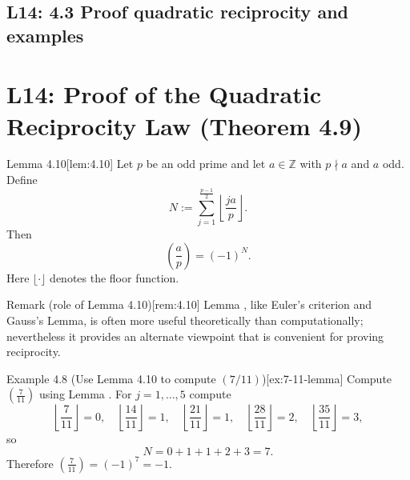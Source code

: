 \documentclass[10pt]{article}
\theoremstyle{definition}
\theoremstyle{plain}
\numberwithin{equation}{section}
\begin{document}
\newpage
\subsection{L14: 4.3 Proof quadratic reciprocity and examples}

\section*{L14: Proof of the Quadratic Reciprocity Law (Theorem 4.9)}

\begin{define}{Lemma 4.10}[lem:4.10]
Let $p$ be an odd prime and let $a\in\mathbb{Z}$ with $p\nmid a$ and $a$ odd. Define
\[
N:=\sum_{j=1}^{\frac{p-1}{2}}\left\lfloor\frac{j a}{p}\right\rfloor .
\]
Then
\[
\left(\frac{a}{p}\right)=(-1)^N.
\]
Here $\lfloor \cdot\rfloor$ denotes the floor function.
\end{define}

\begin{define}{Remark (role of Lemma 4.10)}[rem:4.10]
Lemma , like Euler's criterion and Gauss's Lemma, is often more useful theoretically than computationally; nevertheless it provides an alternate viewpoint that is convenient for proving reciprocity.
\end{define}

\begin{define}{Example 4.8 (Use Lemma 4.10 to compute $(7/11)$)}[ex:7-11-lemma]
Compute $(\tfrac{7}{11})$ using Lemma . For $j=1,\dots,5$ compute
\[
\left\lfloor\frac{7}{11}\right\rfloor=0,\quad
\left\lfloor\frac{14}{11}\right\rfloor=1,\quad
\left\lfloor\frac{21}{11}\right\rfloor=1,\quad
\left\lfloor\frac{28}{11}\right\rfloor=2,\quad
\left\lfloor\frac{35}{11}\right\rfloor=3,
\]
so
\[
N=0+1+1+2+3=7.
\]
Therefore $(\tfrac{7}{11})=(-1)^7=-1$.
\end{define}
\end{document}
